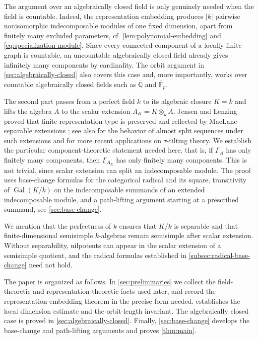 \documentclass[11pt,letterpaper,reqno]{amsart}
\theoremstyle{definition}
\DeclareMathOperator{\Gal}{Gal}
\newcommand{\kkbar}{\overline{k}}
\begin{document}
The argument over an algebraically closed field is only genuinely needed
when the field is countable.  Indeed, the representation embedding produces
$|k|$ pairwise nonisomorphic indecomposable modules of one fixed dimension,
apart from finitely many excluded parameters, cf. \cref{lem:polynomial-embedding} and \cref{eq:specialization-module}.  Since every connected component of
a locally finite graph is countable, an uncountable algebraically
closed field already gives infinitely many components by cardinality.  The
orbit argument in \cref{sec:algebraically-closed} also covers this case and, more importantly, works over
countable algebraically closed fields such as $\overline{\mathbb Q}$ and
$\overline{\mathbb F}_p$.

The second part passes from a perfect field $k$ to its algebraic closure
$K=\kkbar$ and lifts the algebra $A$ to the scalar extension $A_K=K\otimes_kA$.  
Jensen and Lenzing proved that finite representation type is
preserved and reflected by MacLane-separable extensions
\cite[Theorem~3.3]{JensenLenzing}; see also \cite{Kasjan} for the behavior of
almost split sequences under such extensions and \cite{BHK25} for more recent applications on $\tau$-tilting theory.  We establish the particular
component-theoretic statement needed here, that is, if $\Gamma_A$ has only finitely
many components, then $\Gamma_{A_K}$ has only finitely many components.
This is not trivial, since scalar extension can split an indecomposable
module.  The proof uses base-change formulas for the categorical radical and
its square, transitivity of $\Gal(K/k)$ on the indecomposable summands of an
extended indecomposable module, and a path-lifting argument starting at a
prescribed summand, see \cref{sec:base-change}.

We mention that the perfectness of $k$ ensures that $K/k$ is
separable and that finite-dimensional semisimple $k$-algebras remain
semisimple after scalar extension.  Without separability, nilpotents can
appear in the scalar extension of a semisimple quotient, and the radical
formulas established in \cref{subsec:radical-base-change}
 need not hold.  



The paper is organized as follows.  In \cref{sec:preliminaries} we collect
the field-theoretic and representation-theoretic facts used later, and
record the representation-embedding theorem in the precise form needed.
 establishes the local dimension estimate and the orbit-length
invariant.  The algebraically closed case is proved in
\cref{sec:algebraically-closed}.  Finally, \cref{sec:base-change} develops
the base-change and path-lifting arguments and proves \cref{thm:main}.
\end{document}
